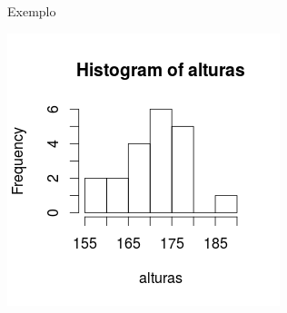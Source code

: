 \documentclass{beamer}
\begin{document}
\begin{frame}{Exemplo}
  \begin{center}
    \includegraphics[height=\textheight]{Desc_I/histograma}
  \end{center}
\end{frame}
\end{document}
